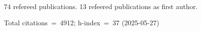 74 refereed publications. 13 refeered publications as first author.

Total citations~=~4912; h-index~=~37 (2025-05-27)